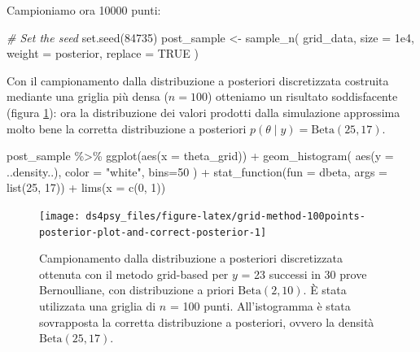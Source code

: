 \documentclass[
  11pt,
]{krantz}
\makeatletter
\newenvironment{Shaded}{\begin{snugshade}}{\end{snugshade}}
\newcommand{\AttributeTok}[1]{\textcolor[rgb]{0.61,0.61,0.61}{#1}}
\newcommand{\CommentTok}[1]{\textcolor[rgb]{0.37,0.37,0.37}{\textit{#1}}}
\newcommand{\ConstantTok}[1]{\textcolor[rgb]{0,0,0}{#1}}
\newcommand{\DecValTok}[1]{\textcolor[rgb]{0.06,0.06,0.06}{#1}}
\newcommand{\FloatTok}[1]{\textcolor[rgb]{0.06,0.06,0.06}{#1}}
\newcommand{\FunctionTok}[1]{\textcolor[rgb]{0,0,0}{#1}}
\newcommand{\NormalTok}[1]{#1}
\newcommand{\OtherTok}[1]{\textcolor[rgb]{0.37,0.37,0.37}{#1}}
\newcommand{\SpecialCharTok}[1]{\textcolor[rgb]{0,0,0}{#1}}
\newcommand{\StringTok}[1]{\textcolor[rgb]{0.5,0.5,0.5}{#1}}
\newenvironment{kframe}{%
\medskip{}
\setlength{\fboxsep}{.8em}
 \def\at@end@of@kframe{}%
 \ifinner\ifhmode%
  \def\at@end@of@kframe{\end{minipage}}%
  \begin{minipage}{\columnwidth}%
 \fi\fi%
 \def\FrameCommand##1{\hskip\@totalleftmargin \hskip-\fboxsep
 \colorbox{shadecolor}{##1}\hskip-\fboxsep
     \hskip-\linewidth \hskip-\@totalleftmargin \hskip\columnwidth}%
 \MakeFramed {\advance\hsize-\width
   \@totalleftmargin\z@ \linewidth\hsize
   \@setminipage}}%
 {\par\unskip\endMakeFramed%
 \at@end@of@kframe}
\renewenvironment{Shaded}{\begin{kframe}}{\end{kframe}}
\theoremstyle{definition}
\theoremstyle{definition}
\theoremstyle{definition}
\theoremstyle{definition}
\theoremstyle{remark}
\makeatother
\begin{document}
Campioniamo ora 10000 punti:

\begin{Shaded}
\begin{Highlighting}[]
\CommentTok{\# Set the seed}
\FunctionTok{set.seed}\NormalTok{(}\DecValTok{84735}\NormalTok{)}
\NormalTok{post\_sample }\OtherTok{\textless{}{-}} \FunctionTok{sample\_n}\NormalTok{(}
\NormalTok{  grid\_data,}
  \AttributeTok{size =} \FloatTok{1e4}\NormalTok{,}
  \AttributeTok{weight =}\NormalTok{ posterior,}
  \AttributeTok{replace =} \ConstantTok{TRUE}
\NormalTok{)}
\end{Highlighting}
\end{Shaded}

Con il campionamento dalla distribuzione a posteriori discretizzata costruita mediante una griglia più densa (\(n = 100\)) otteniamo un risultato soddisfacente (figura \ref{fig:grid-method-100points-posterior-plot-and-correct-posterior}): ora la distribuzione dei valori prodotti dalla simulazione approssima molto bene la corretta distribuzione a posteriori \(p(\theta \mid y) = \mbox{Beta}(25, 17)\).

\begin{Shaded}
\begin{Highlighting}[]
\NormalTok{post\_sample }\SpecialCharTok{\%\textgreater{}\%}
  \FunctionTok{ggplot}\NormalTok{(}\FunctionTok{aes}\NormalTok{(}\AttributeTok{x =}\NormalTok{ theta\_grid)) }\SpecialCharTok{+}
  \FunctionTok{geom\_histogram}\NormalTok{(}
    \FunctionTok{aes}\NormalTok{(}\AttributeTok{y =}\NormalTok{ ..density..),}
    \AttributeTok{color =} \StringTok{"white"}\NormalTok{,}
    \AttributeTok{bins=}\DecValTok{50}
\NormalTok{  ) }\SpecialCharTok{+}
  \FunctionTok{stat\_function}\NormalTok{(}\AttributeTok{fun =}\NormalTok{ dbeta, }\AttributeTok{args =} \FunctionTok{list}\NormalTok{(}\DecValTok{25}\NormalTok{, }\DecValTok{17}\NormalTok{)) }\SpecialCharTok{+}
  \FunctionTok{lims}\NormalTok{(}\AttributeTok{x =} \FunctionTok{c}\NormalTok{(}\DecValTok{0}\NormalTok{, }\DecValTok{1}\NormalTok{))}
\end{Highlighting}
\end{Shaded}

\begin{figure}[h]

{\centering \texttt{[image: ds4psy\_files/figure-latex/grid-method-100points-posterior-plot-and-correct-posterior-1]} 

}

\caption{Campionamento dalla  distribuzione a posteriori discretizzata ottenuta con il metodo grid-based per $y$ = 23 successi in 30 prove Bernoulliane, con distribuzione a priori $\mbox{Beta}(2, 10)$. È stata utilizzata una griglia di $n$ = 100 punti. All'istogramma è stata sovrapposta la corretta distribuzione a posteriori, ovvero la densità $\mbox{Beta}(25, 17)$.}\label{fig:grid-method-100points-posterior-plot-and-correct-posterior}
\end{figure}
\end{document}
